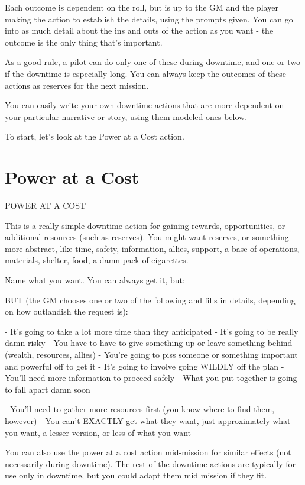 Each outcome is dependent on the roll, but is up to the GM and the player making the action to
establish the details, using the prompts given. You can go into as much detail about the ins and
outs of the action as you want - the outcome is the only thing that’s important.

As a good rule, a pilot can do only one of these during downtime, and one or two if the downtime
is especially long. You can always keep the outcomes of these actions as reserves for the next
mission.

You can easily write your own downtime actions that are more dependent on your particular
narrative or story, using them modeled ones below.

To start, let’s look at the Power at a Cost action.

\section{Power at a Cost}
POWER AT A COST

This is a really simple downtime action for gaining rewards, opportunities, or additional
resources (such as reserves). You might want reserves, or something more abstract, like time,
safety, information, allies, support, a base of operations, materials, shelter, food, a damn
pack of cigarettes.


Name what you want. You can always get it, but:

BUT (the GM chooses one or two of the following and fills in details, depending on how
outlandish the request is):

    -    It’s going to take a lot more time than they anticipated
    -    It’s going to be really damn risky
    -    You have to have to give something up or leave something behind (wealth, resources,
         allies)
    -    You’re going to piss someone or something important and powerful off to get it
    -    It’s going to involve going WILDLY off the plan
    -    You’ll need more information to proceed safely
    -    What you put together is going to fall apart damn soon




    -    You’ll need to gather more resources first (you know where to find them, however)
    -    You can’t EXACTLY get what they want, just approximately what you want, a lesser
         version, or less of what you want


You can also use the power at a cost action mid-mission for similar effects (not necessarily
during downtime). The rest of the downtime actions are typically for use only in downtime, but
you could adapt them mid mission if they fit.


